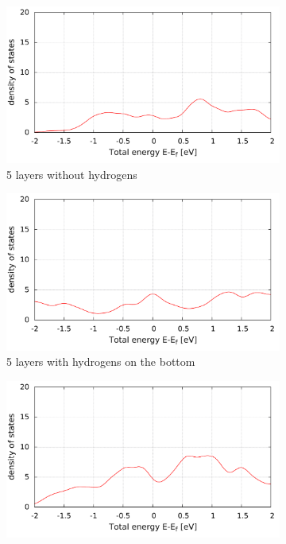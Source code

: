 
	\begin{figure}[tbp]
		\begin{subfigure}[c]{.48\linewidth}
			\centering
			\includegraphics[width=\linewidth]{Te_termination/no_H_DOS_5_layers_-2_2.pdf}
			\caption{5 layers without hydrogens}
		\end{subfigure}
		\hfill
		\begin{subfigure}[c]{.48\linewidth}
			\centering
			\includegraphics[width=\linewidth]{Te_termination/DOS_5_layers_-2_2.pdf}
			\caption{5 layers with hydrogens on the bottom}
		\end{subfigure}
		\begin{subfigure}[c]{.48\linewidth}
			\centering
			\includegraphics[width=\linewidth]{Te_termination/no_H_DOS_9_layers_-2_2.pdf}

\end{subfigure}
\end{figure}
